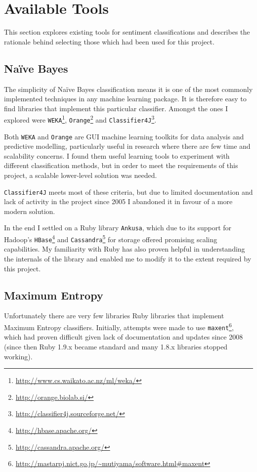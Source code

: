 \section{Available Tools}

This section explores existing tools for sentiment classifications and describes the rationale behind selecting those which had been used for this project. 

\subsection{Na\"ive Bayes}

The simplicity of Na\"ive Bayes classification means it is one of the most commonly implemented techniques in any machine learning package. It is therefore easy to find libraries that implement this particular classifier. Amongst the ones I explored were \verb|WEKA|\footnote{\url{http://www.cs.waikato.ac.nz/ml/weka/}}, \verb|Orange|\footnote{\url{http://orange.biolab.si/}} and \verb|Classifier4J|\footnote{\url{http://classifier4j.sourceforge.net/}}.

Both \verb|WEKA| and \verb|Orange| are GUI machine learning toolkits for data analysis and predictive modelling, particularly useful in research where there are few time and scalability concerns. I found them useful learning tools to experiment with different classification methods, but in order to meet the requirements of this project, a scalable lower-level solution was needed.

\verb|Classifier4J| meets most of these criteria, but due to limited documentation and lack of activity in the project since 2005 I abandoned it in favour of a more modern solution.

In the end I settled on a Ruby library \verb|Ankusa|, which due to its support for Hadoop's \verb|HBase|\footnote{\url{http://hbase.apache.org/}} and \verb|Cassandra|\footnote{\url{http://cassandra.apache.org/}} for storage offered promising scaling capabilities. My familiarity with Ruby has also proven helpful in understanding the internals of the library and enabled me to modify it to the extent required by this project.

\subsection{Maximum Entropy}

Unfortunately there are very few libraries Ruby libraries that implement Maximum Entropy classifiers. Initially, attempts were made to use \verb|maxent|\footnote{\url{http://mastarpj.nict.go.jp/~mutiyama/software.html\#maxent}}, which had proven difficult given lack of documentation and updates since 2008 (since then Ruby 1.9.x became standard and many 1.8.x libraries stopped working).

